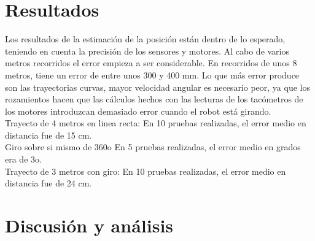 \documentclass[oneside,twocolumn]{article}
\begin{document}
\section{Resultados}

Los resultados de la estimación de la posición están dentro de lo esperado, teniendo en cuenta la precisión de los sensores y motores. Al cabo de varios metros recorridos el error empieza
a ser considerable. En recorridos de unos 8 metros, tiene un error de entre unos 300 y 400 mm. Lo que más error produce son las trayectorias curvas, mayor velocidad angular es necesario peor, ya que los rozamientos hacen que las cálculos hechos con las lecturas de los tacómetros de los motores introduzcan demasiado error cuando el robot está girando.\\

Trayecto de 4 metros en linea recta: En 10 pruebas realizadas, el error medio en
distancia fue de 15 cm.\\
Giro sobre si mismo de 360o En 5 pruebas realizadas, el error medio en grados era
de 3o.\\
Trayecto de 3 metros con giro: En 10 pruebas realizadas, el error medio en distancia
fue de 24 cm.\\


\section{Discusión y análisis}



\onecolumn
\begin{thebibliography}{99} %

  
\end{thebibliography}

\end{document}
